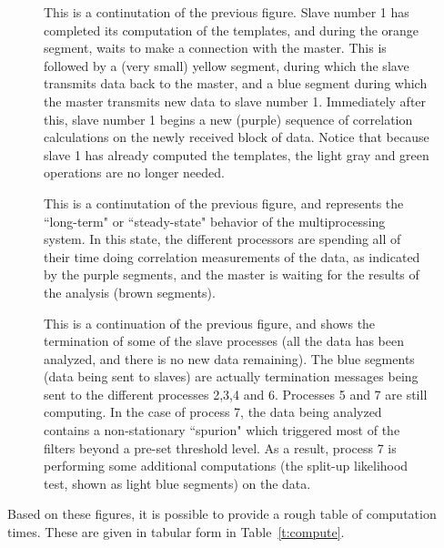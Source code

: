 \begin{figure}
\caption{\label{f:nupshot2} 
This is a continutation of the previous figure.  Slave number 1 has
completed its computation of the templates, and during the orange
segment, waits to make a connection with the master.  This is followed
by a (very small) yellow segment, during which the slave transmits data
back to the master, and a blue segment during which the master
transmits new data to slave number 1.  Immediately after this, slave
number 1 begins a new (purple) sequence of correlation calculations on
the newly received block of data.  Notice that because slave 1 has
already computed the templates, the light gray and green operations are
no longer needed. }
\end{figure}

\begin{figure}
\caption{\label{f:nupshot3} 
This is a continutation of the previous figure, and represents the
``long-term" or ``steady-state" behavior of the multiprocessing
system.  In this state, the different processors are spending all of
their time doing correlation measurements of the data, as indicated by
the purple segments, and the master is waiting for the results of the
analysis (brown segments).}
\end{figure}

\begin{figure}
\caption{\label{f:nupshot4} 
This is a continuation of the previous figure, and shows the
termination of some of the slave processes (all the data has been
analyzed, and there is no new data remaining).  The blue segments (data
being sent to slaves) are actually termination messages being sent to
the different processes 2,3,4 and 6.  Processes 5 and 7 are still
computing.  In the case of process 7, the data being analyzed contains
a non-stationary ``spurion" which triggered most of the filters beyond
a pre-set threshold level.  As a result, process 7 is performing some
additional computations (the split-up likelihood test, shown as light
blue segments) on the data.}
\end{figure}

Based on these figures, it is possible to provide a rough table of
computation times.  These are given in tabular form in
Table~\ref{t:compute}.


